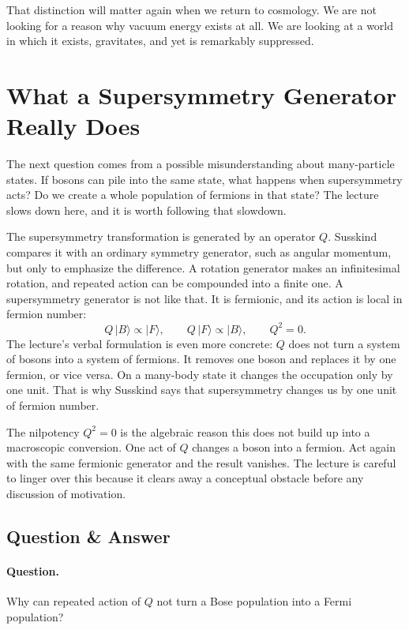 That distinction will matter again when we return to cosmology. We are not looking for a reason why vacuum energy exists at all. We are looking at a world in which it exists, gravitates, and yet is remarkably suppressed.

\section{What a Supersymmetry Generator Really Does}

The next question comes from a possible misunderstanding about many-particle states. If bosons can pile into the same state, what happens when supersymmetry acts? Do we create a whole population of fermions in that state? The lecture slows down here, and it is worth following that slowdown.

The supersymmetry transformation is generated by an operator \(Q\). Susskind compares it with an ordinary symmetry generator, such as angular momentum, but only to emphasize the difference. A rotation generator makes an infinitesimal rotation, and repeated action can be compounded into a finite one. A supersymmetry generator is not like that. It is fermionic, and its action is local in fermion number:
\begin{equation}
Q\,|B\rangle \propto |F\rangle,
\qquad
Q\,|F\rangle \propto |B\rangle,
\qquad
Q^2=0.
\end{equation}
The lecture's verbal formulation is even more concrete: \(Q\) does not turn a system of bosons into a system of fermions. It removes one boson and replaces it by one fermion, or vice versa. On a many-body state it changes the occupation only by one unit. That is why Susskind says that supersymmetry changes us by one unit of fermion number.

The nilpotency \(Q^2=0\) is the algebraic reason this does not build up into a macroscopic conversion. One act of \(Q\) changes a boson into a fermion. Act again with the same fermionic generator and the result vanishes. The lecture is careful to linger over this because it clears away a conceptual obstacle before any discussion of motivation.

\subsection{Question \& Answer}

\paragraph{Question.} Why can repeated action of \(Q\) not turn a Bose population into a Fermi population?

